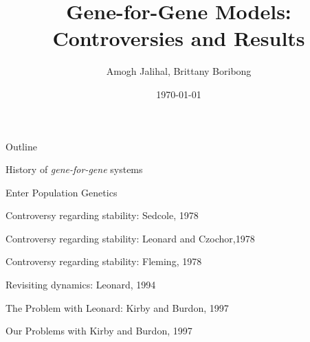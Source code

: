 \documentclass[presentation]{beamer}
\author{Amogh Jalihal, Brittany Boribong}
\date{\today}
\title{Gene-for-Gene Models: Controversies and Results}
\begin{document}
\maketitle
\begin{frame}{Outline}
\tableofcontents
\end{frame}

\begin{frame}[label=sec-1]{History of \emph{gene-for-gene} systems}
\end{frame}

\begin{frame}[label=sec-2]{Enter Population Genetics}
\end{frame}
\begin{frame}[label=sec-3]{Controversy regarding stability: Sedcole, 1978}
\end{frame}
\begin{frame}[label=sec-4]{Controversy regarding stability: Leonard and Czochor,1978}
\end{frame}
\begin{frame}[label=sec-5]{Controversy regarding stability: Fleming, 1978}
\end{frame}
\begin{frame}[label=sec-6]{Revisiting dynamics: Leonard, 1994}
\end{frame}
\begin{frame}[label=sec-7]{The Problem with Leonard: Kirby and Burdon, 1997}
\end{frame}
\begin{frame}[label=sec-8]{Our Problems with Kirby and Burdon, 1997}


\end{frame}
\end{document}
